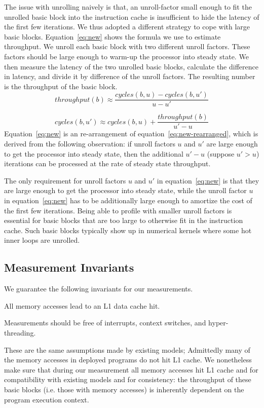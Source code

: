 The issue with unrolling naively is that,
an unroll-factor small enough to fit the 
unrolled basic block into the instruction cache is 
insufficient to hide the latency of the first few iterations.
We thus adopted a different strategy to cope with large basic blocks.
Equation~\ref{eq:new} shows the formula we use to estimate throughput.
We unroll each basic block with two different unroll factors.
These factors should be large enough 
to warm-up the processor into steady state.
We then measure the latency of the two unrolled basic blocks,
calculate the difference in latency, and divide it 
by difference of the unroll factors.
The resulting number is the throughput of the basic block.
\begin{equation}
\mathit{throughput}(b) \approx 
\frac{\mathit{cycles}(b, u) - \mathit{cycles}(b, u')}{u-u'}
\label{eq:new}
\end{equation}

\begin{equation}
\mathit{cycles}(b, u') \approx 
\mathit{cycles}(b, u) + \frac{\mathit{throughput(b)}}{u'-u}
\label{eq:new-rearranged}
\end{equation}
Equation~\ref{eq:new} is an re-arrangement of equation~\ref{eq:new-rearranged},
which is derived from the following observation:
if unroll factors $u$ and $u'$ are large enough
to get the processor into steady state,
then the additional $u'-u$ (suppose $u' > u$) iterations can be processed at 
the rate of steady state throughput.

The only requirement for unroll factors $u$ and $u'$ in equation~\ref{eq:new}
is that they are large enough to get the processor into steady state,
while the unroll factor $u$ in equation~\ref{eq:new} has to be additionally
large enough to amortize the cost of the first few iterations.
Being able to profile with smaller unroll factors is essential
for basic blocks that are too large to otherwise fit in the instruction cache.
Such basic blocks typically show up in numerical kernels where
some hot inner loops are unrolled.


\subsection{Measurement Invariants}\label{sec:invariants}
We guarantee the following invariants for our measurements.
\begin{enumerate*}
    \item All memory accesses lead to an L1 data cache hit. 
    \item Measurements should be free of interrupts, context switches,
    and hyper-threading.
\end{enumerate*}
These are the same assumptions made by existing models;
Admittedly many of the memory accesses in deployed programs do not hit L1 cache.
We nonetheless make sure that during our measurement all memory accesses hit L1 cache 
and for compatibility with existing models and for consistency:
the throughput of these basic blocks (i.e. those with memory accesses)
is inherently dependent on the program execution context.

